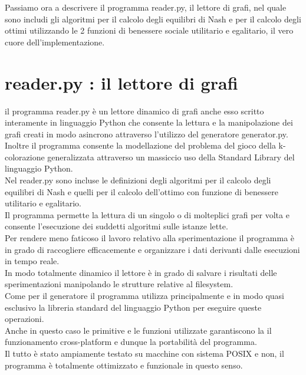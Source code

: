 Passiamo ora a descrivere il programma reader.py, il lettore di grafi, nel quale sono includi gli algoritmi per il calcolo degli equilibri di Nash e per il calcolo degli ottimi utilizzando le 2 funzioni di benessere sociale utilitario e egalitario, il vero cuore dell'implementazione.\\


\section{reader.py : il lettore di grafi}
\justify
il programma reader.py è un lettore dinamico di grafi anche esso scritto interamente in linguaggio Python che consente la lettura e la manipolazione dei grafi creati in modo asincrono attraverso l'utilizzo del generatore generator.py.\\

Inoltre il programma consente la modellazione del problema del gioco della k-colorazione generalizzata attraverso un massiccio uso della Standard Library del linguaggio Python.\\

Nel reader.py sono incluse le definizioni degli algoritmi per il calcolo degli equilibri di Nash e quelli per il calcolo dell'ottimo con funzione di benessere utilitario e egalitario.\\
Il programma permette la lettura di un singolo o di molteplici grafi per volta e consente l'esecuzione dei suddetti algoritmi sulle istanze lette.\\

Per rendere meno faticoso il lavoro relativo alla sperimentazione il programma è in grado di raccogliere efficacemente e organizzare i dati derivanti dalle esecuzioni in tempo reale.\\

In modo totalmente dinamico il lettore è in grado di salvare i risultati delle sperimentazioni manipolando le strutture relative al filesystem.\\
Come per il generatore il programma utilizza principalmente e in modo quasi esclusivo la libreria standard del linguaggio Python per eseguire queste operazioni.\\
Anche in questo caso le primitive e le funzioni utilizzate garantiscono la il funzionamento cross-platform e dunque la portabilità del programma.\\ Il tutto è stato ampiamente testato su macchine con sistema POSIX e non, il programma è totalmente ottimizzato e funzionale in questo senso.\\

